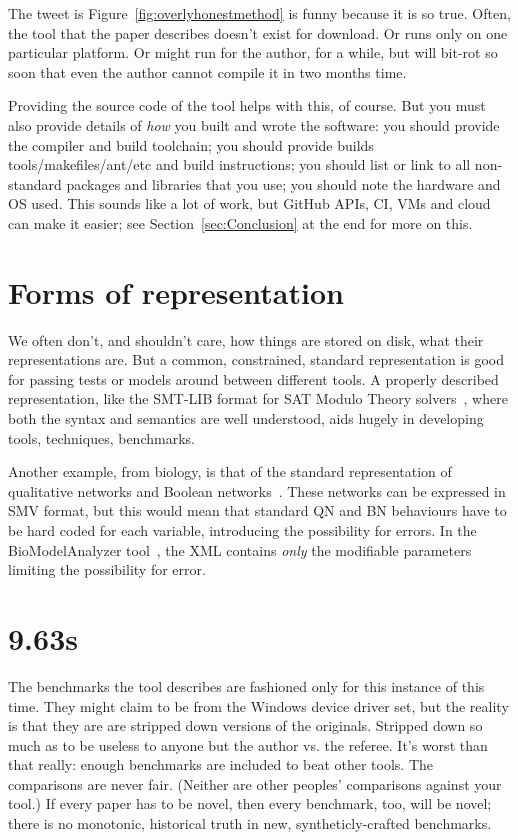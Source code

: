 \documentclass[conference]{IEEEtran}
\begin{document}
The tweet is Figure~\ref{fig:overlyhonestmethod} is funny because it
is so true. Often, the tool that the paper describes doesn't exist for
download. Or runs only on one particular platform. Or might run for
the author, for a while, but will bit-rot so soon that even the author
cannot compile it in two months time.

Providing the source code of the tool helps with this, of course. But
you must also provide details of \emph{how} you built and wrote the
software:
%
you should provide the compiler and build toolchain; 
%
you should provide builds tools/makefiles/ant/etc and build instructions; 
%
you should list or link to all non-standard packages and libraries that you use; 
%
you should note the hardware and OS used. 
%
This sounds like a lot of work, but GitHub APIs, CI, VMs and cloud can
make it easier; see Section~\ref{sec:Conclusion} at the end for more
on this.


\section{Forms of representation}


We often don't, and shouldn't care, how things are stored on disk,
what their representations are. But a common, constrained, standard
representation is good for passing tests or models around between
different tools. A properly described representation, like the SMT-LIB
format for SAT Modulo Theory solvers~\cite{smtlib}, where both the
syntax and semantics are well understood, aids hugely in developing
tools, techniques, benchmarks.

Another example, from biology, is that of the standard representation
of qualitative networks and Boolean
networks~\cite{Kauffman1969,Schaub2007}.  These networks can be
expressed in SMV format, but this would mean that standard QN and BN
behaviours have to be hard coded for each variable, introducing the
possibility for errors. In the BioModelAnalyzer
tool~\cite{Benque2012}, the XML contains \emph{only} the modifiable
parameters limiting the possibility for error.


\section{9.63s} 

The benchmarks the tool describes are fashioned only for this instance
of this time. They might claim to be from the Windows device driver
set, but the reality is that they are are stripped down versions of
the originals. Stripped down so much as to be useless to anyone but
the author vs. the referee. It's worst than that really: enough
benchmarks are included to beat other tools. The comparisons are never
fair. (Neither are other peoples' comparisons against your tool.) If
every paper has to be novel, then every benchmark, too, will be novel;
there is no monotonic, historical truth in new, syntheticly-crafted
benchmarks.
\end{document}
